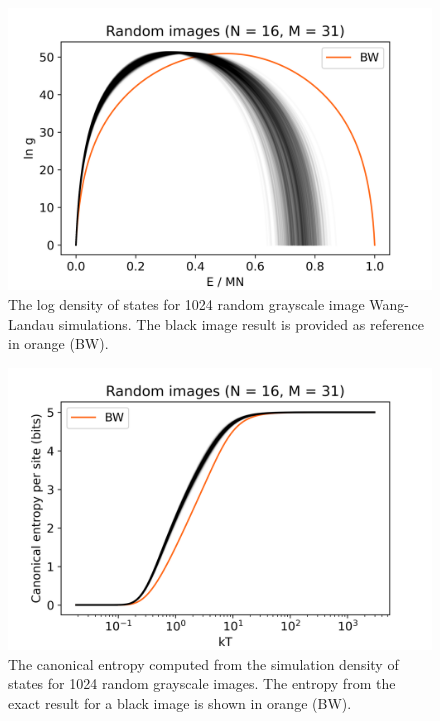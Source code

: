 \documentclass[aps,reprint,floatfix]{revtex4-2}
\theoremstyle{plain}
\theoremstyle{definition}
\begin{document}
\begin{figure}
  \centering
  \includegraphics[width=\linewidth]{wanglandau-gray}
  \caption{The log density of states for \num{1024} random grayscale image
    Wang-Landau simulations. The black image result is provided as
  reference in orange (BW).}\label{fig:wl-gray}
\end{figure}

\begin{figure}
  \centering
  \includegraphics[width=\linewidth]{wanglandau-gray-S}
  \caption{The canonical entropy computed from the simulation density of states for
    \num{1024} random grayscale images. The entropy from the exact result for a
  black image is shown in orange (BW).}\label{fig:wl-gray-S}
\end{figure}
\end{document}
